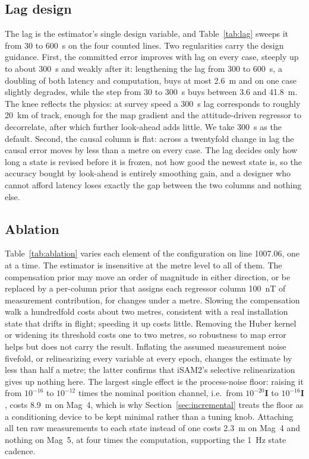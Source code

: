 \subsection{Lag design}\label{sec:lagdesign}
The lag is the estimator's single design variable, and Table~\ref{tab:lag}
sweeps it from \SI{30}{} to \SI{600}{\second} on the four counted lines. Two
regularities carry the design guidance. First, the committed error improves
with lag on every case, steeply up to about \SI{300}{\second} and weakly after
it: lengthening the lag from \SI{300}{} to \SI{600}{\second}, a
doubling of both latency and computation, buys at most \SI{2.6}{\meter} and on
one case slightly degrades, while the step from \SI{30}{} to \SI{300}{\second}
buys between \SI{3.6}{} and \SI{41.8}{\meter}. The knee reflects the physics: at
survey speed a \SI{300}{\second} lag corresponds to roughly \SI{20}{\kilo\meter}
of track, enough for the map gradient and the attitude-driven regressor to
decorrelate, after which further look-ahead adds little. We take
\SI{300}{\second} as the default. Second, the causal column is flat: across a
twentyfold change in lag the causal error moves by less than a metre on every
case. The lag decides only how long a state is revised before it is frozen, not
how good the newest state is, so the accuracy bought by look-ahead is entirely
smoothing gain, and a designer who cannot afford latency loses exactly the gap
between the two columns and nothing else.

\subsection{Ablation}\label{sec:ablation}
Table~\ref{tab:ablation} varies each element of the configuration on line
1007.06, one at a time. The estimator is insensitive at the metre level to all
of them. The compensation prior may move an order of magnitude in either
direction, or be replaced by a per-column prior that assigns each regressor
column \SI{100}{\nano\tesla} of measurement contribution, for changes under a
metre. Slowing the compensation walk a hundredfold costs about two metres,
consistent with a real installation state that drifts in flight; speeding it up
costs little. Removing the Huber kernel or widening its threshold costs one to
two metres, so robustness to map error helps but does not carry the result.
Inflating the assumed measurement noise fivefold, or relinearizing every
variable at every epoch, changes the estimate by less than half a metre; the
latter confirms that iSAM2's selective relinearization gives up nothing here.
The largest single effect is the process-noise floor: raising it from
$10^{-16}$ to $10^{-12}$ times the nominal position channel, i.e.\ from
$10^{-20}\mathbf{I}$ to $10^{-16}\mathbf{I}$, costs \SI{8.9}{\meter} on Mag~4,
which is why Section~\ref{sec:incremental} treats the floor as a conditioning
device to be kept minimal rather than a tuning knob. Attaching all ten raw
measurements to each state instead of one costs \SI{2.3}{\meter} on Mag~4 and
nothing on Mag~5, at four times the computation, supporting the
\SI{1}{\hertz} state cadence.

